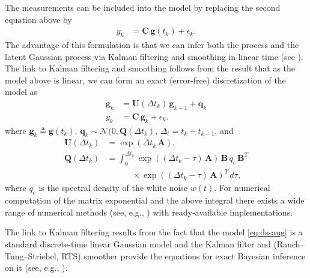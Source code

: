 \documentclass[journal]{IEEEtran}
\begin{document}
%
The measurements can be included into the model by replacing the second equation above by
%
\begin{equation}
\begin{split}
  y_k &= \mathbf{C} \, \mathbf{g}(t_k) + \epsilon_k.
\end{split}
\label{eq:ssaugkf}
\end{equation}
%
The advantage of this formulation is that we can infer both the process and the latent Gaussian process via Kalman filtering and smoothing in linear time (see \cite{Hartikainen+Sarkka:2010,Sarkka+Solin+Hartikainen:2013}). The link to Kalman filtering and smoothing follows from the result that as the model above is linear, we can form an exact (error-free) discretization of the model as
%
\begin{equation}
\begin{split}
  \mathbf{g}_k
  &= \mathbf{U}(\Delta t_k) \, \mathbf{g}_{k-1}
  + \mathbf{q}_k \\
  y_k &= \mathbf{C} \, \mathbf{g}_k + \epsilon_k.
\end{split}
\label{eq:dssaug}
\end{equation}
%
where $\mathbf{g}_k \triangleq \mathbf{g}(t_k)$, $\mathbf{q}_k \sim \mathcal{N}(0,\mathbf{Q}(\Delta t_k)$, $\Delta_t = t_k - t_{k-1}$, and
%
\begin{equation}
\begin{split}
  \mathbf{U}(\Delta t_k)  &= \exp(\Delta t_k \, \mathbf{A}), \\
  \mathbf{Q}(\Delta t_k) &= \int_0^{\Delta t_k} \exp((\Delta t_k - \tau) \, \mathbf{A}) \,
  \mathbf{B} \, q_c  \, \mathbf{B}^T \\
  &\qquad \quad \times \exp((\Delta t_k - \tau) \, \mathbf{A})^T \, d\tau,
\end{split}
\label{eq:dssaug}
\end{equation}
%
where $q_c$ is the spectral density of the white noise $w(t)$. For numerical computation of the matrix exponential and the above integral there exists a wide range of numerical methods (see, e.g., \cite{Grewal+Andrews:2001,Sarkka:2006}) with ready-available implementations.

The link to Kalman filtering results from the fact that the model \eqref{eq:dssaug} is a standard discrete-time linear Gaussian model and the Kalman filter and (Rauch--Tung--Striebel, RTS) smoother provide the equations for exact Bayesian inference on it (see, e.g., \cite{Sarkka:2013}). 
\end{document}
